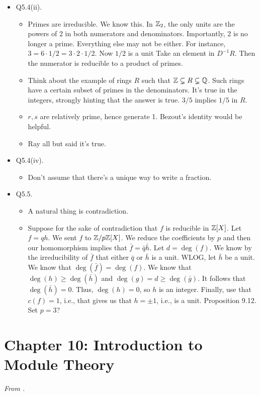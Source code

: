 \documentclass[../notes.tex]{subfiles}
\begin{document}
\begin{itemize}
\begin{itemize}
    \end{itemize}
    \item Q5.4(ii).
    \begin{itemize}
        \item Primes are irreducible. We know this. In $\mathbb{Z}_2$, the only units are the powers of 2 in both numerators and denominators. Importantly, 2 is no longer a prime. Everything else may not be either. For instance, $3=6\cdot 1/2=3\cdot 2\cdot 1/2$. Now $1/2$ is a unit Take an element in $D^{-1}R$. Then the numerator is reducible to a product of primes.
        \item Think about the example of rings $R$ such that $\mathbb{Z}\subsetneq R\subsetneq\mathbb{Q}$. Such rings have a certain subset of primes in the denominators. It's true in the integers, strongly hinting that the answer is true. $3/5$ implies $1/5$ in $R$.
        \item $r,s$ are relatively prime, hence generate 1. Bezout's identity would be helpful.
        \item Ray all but said it's true.
    \end{itemize}
    \item Q5.4(iv).
    \begin{itemize}
        \item Don't assume that there's a unique way to write a fraction.
    \end{itemize}
    \item Q5.5.
    \begin{itemize}
        \item A natural thing is contradiction.
        \item Suppose for the sake of contradiction that $f$ is reducible in $\mathbb{Z}[X]$. Let $f=qh$. We sent $f$ to $\mathbb{Z}/p\mathbb{Z}[X]$. We reduce the coefficients by $p$ and then our homomorphism implies that $\bar{f}=\bar{q}\bar{h}$. Let $d=\deg(f)$. We know by the irreducibility of $\bar{f}$ that either $\bar{q}$ or $\bar{h}$ is a unit. WLOG, let $\bar{h}$ be a unit. We know that $\deg(\bar{f})=\deg(f)$. We know that $\deg(h)\geq\deg(\bar{h})$ and $\deg(g)=d\geq\deg(\bar{g})$. It follows that $\deg(\bar{h})=0$. Thus, $\deg(h)=0$, so $h$ is an integer. Finally, use that $c(f)=1$, i.e., that gives us that $h=\pm 1$, i.e., is a unit. Proposition 9.12. Set $p=3$?
    \end{itemize}
\end{itemize}



\section{Chapter 10: Introduction to Module Theory}
\emph{From \textcite{bib:DummitFoote}.}
\setcounter{bookch}{10}
\end{document}
